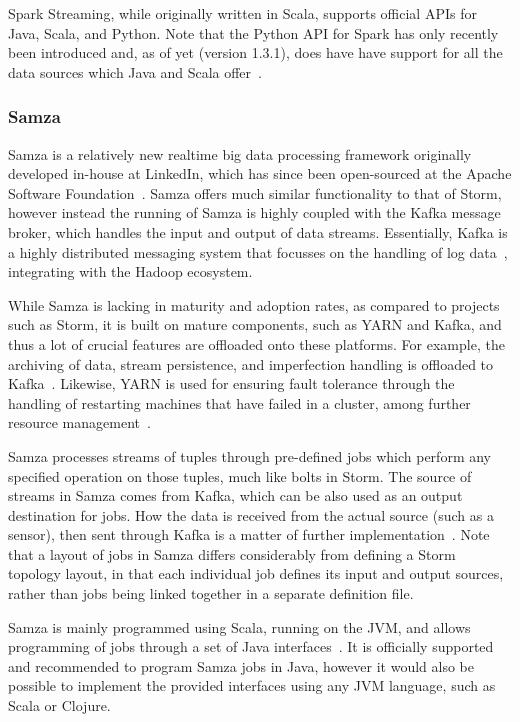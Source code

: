 Spark Streaming, while originally written in Scala, supports official APIs for Java, Scala, and Python. Note that the
Python API for Spark has only recently been introduced and, as of yet (version 1.3.1), does have have support for all
the data sources which Java and Scala offer~\cite{Spark5:online}.



\subsubsection{Samza} %
\label{ssub:samza}

Samza is a relatively new realtime big data processing framework originally developed in-house at LinkedIn, which has since been
open-sourced at the Apache Software Foundation~\cite{web_samza}. Samza offers much similar functionality to that of
Storm, however instead the running of Samza is highly coupled with the Kafka message broker, which handles the input
and output of data streams. Essentially, Kafka is a highly distributed messaging system that focusses on the handling
of log data~\cite{kreps2011kafka}, integrating with the Hadoop ecosystem.

While Samza is lacking in maturity and adoption rates, as compared to projects such as Storm, it is built on mature
components, such as YARN and Kafka, and thus a lot of crucial features are offloaded onto these platforms. For example,
the archiving of data, stream persistence, and imperfection handling is offloaded to Kafka~\cite{bockermann2014survey}.
Likewise, YARN is used for ensuring fault tolerance through the handling of restarting machines that have failed in a
cluster, among further resource management~\cite{bockermann2014survey}.

Samza processes streams of tuples through pre-defined jobs which perform any specified operation on those tuples, much
like bolts in Storm. The source of streams in Samza comes from Kafka, which can be also used as an output destination
for jobs. How the data is received from the actual source (such as a sensor), then sent through Kafka is a matter of
further implementation~\cite{yangradstack}. Note that a layout of jobs in Samza differs considerably from defining
a Storm topology layout, in that each individual job defines its input and output sources, rather than jobs being
linked together in a separate definition file.

Samza is mainly programmed using Scala, running on the JVM, and allows programming of jobs through a set of Java
interfaces~\cite{Samza6:online}. It is officially supported and recommended to program Samza jobs in Java, however it
would also be possible to implement the provided interfaces using any JVM language, such as Scala or Clojure.

